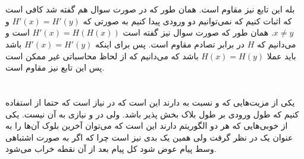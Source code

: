 \documentclass[]{article}
\begin{document}
\printheader

\section{}
بله این تابع نیز مقاوم است. همان طور که در صورت سوال هم گفته شد کافی است که اثبات کنیم که نمی‌توانیم
دو ورودی پیدا کنیم به صورتی که
$H'(x) = H'(y)$ و $x \neq y$.
همان طور که صورت سوال نیز گفته است
$H'(x) = H(H(x))$
است و می‌دانیم که
$H$
در برابر تصادم مقاوم است. پس برای اینکه
$H'(x) = H'(y)$
باشد باید عملا
$H(x) = H(y)$
باشد که می‌دانیم که از لحاظ محاسباتی غیر ممکن است پس این تابع نیز مقاوم است.
\section{}
یکی از مزیت‌هایی که
 و 
نسبت به
دارند این است که در
نیاز است که حتما از
استفاده کنیم که طول ورودی بر طول بلاک بخش پذیر باشد. ولی در
 و 
نیازی به آن نیست. یکی از خوبی‌هایی که هر دو الگوریتم دارند این است که می‌توان آخرین بلوک آن‌ها را به عنوان یک
در نظر گرفت ولی همین یک بدی نیز است چرا که اگر به صورت اشتباهی وسط پیام عوض شود کل پیام بعد از آن
نقطه خراب می‌شود.

\noindent
{}
\end{document}
